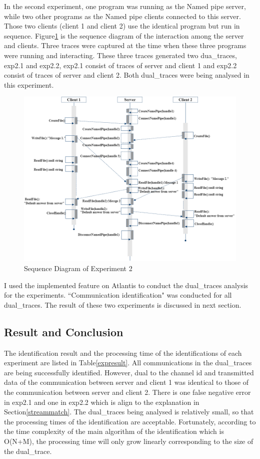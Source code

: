 In the second experiment, one program was running as the Named pipe server, while two other programs as the Named pipe clients connected to this server. Those two clients (client 1 and client 2) use the identical program but run in sequence. Figure\ref{exp2} is the sequence diagram of  the interaction among the server and clients. Three traces were captured at the time when these three programs were running and interacting. These three traces generated two dua\_traces, exp2.1 and exp2.2, exp2.1 consist of traces of server and client 1 and exp2.2 consist of traces of server and client 2. Both dual\_traces were being analysed in this experiment.

\begin{figure}[H]
\centerline{\includegraphics[scale=0.6]{Figures/exp2}}
 \caption{Sequence Diagram of Experiment 2}
\label{exp2}
\end{figure}

I used the implemented feature on Atlantis to conduct the dual\_traces analysis for the experiments. ``Communication identification" was conducted for all dual\_traces. The result of these two experiments is discussed in next section. 

\subsection{Result and Conclusion}
The identification result and the processing time of the identifications of each experiment are listed in Table\ref{expresult}. All communications in the dual\_traces are being successfully identified. However, dual to the channel id and transmitted data of the communication between server and client 1 was identical to those of the communication  between server and client 2. There is one false negative error in exp2.1 and one in exp2.2 which is align to the explanation in Section\ref{streammatch}. The dual\_traces being analysed is relatively small, so that the processing times of the identification are acceptable. Fortunately, according to the time complexity of the main algorithm of the identification which is O(N+M), the processing time will only grow linearly corresponding to the size of the dual\_trace.


